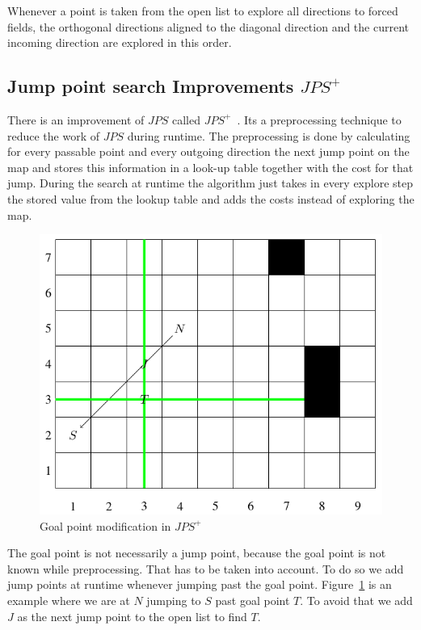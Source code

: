 \documentclass{article}
\begin{document}
    Whenever a point is taken from the open list to explore all directions to forced fields, the orthogonal directions aligned to the diagonal direction and the current incoming direction are explored in this order.
    
    
    \subsection{Jump point search Improvements $JPS^+$}
    
    There is an improvement of $JPS$ called $JPS^+$~\cite{DBLP:conf/aips/HaraborG14}. Its a preprocessing technique to reduce the work of $JPS$ during runtime. The preprocessing is done by calculating for every passable point and every outgoing direction the next jump point on the map and stores this information in a look-up table together with the cost for that jump. During the search at runtime the algorithm just takes in every explore step the stored value from the lookup table and adds the costs instead of exploring the map.
    
        
    \begin{figure}[!htb]
        \centering
        \includegraphics[width=\textwidth]{figures/jpspluspic.png}
        \caption{Goal point modification in $JPS^+$}
        \label{fig:jpsplus}
    \end{figure}
    
    
    The goal point is not necessarily a jump point, because the goal point is not known while preprocessing. That has to be taken into account. To do so we add jump points at runtime whenever jumping past the goal point. Figure~\ref{fig:jpsplus} is an example where we are at $N$ jumping to $S$ past goal point $T$. To avoid that we add $J$ as the next jump point to the open list to find $T$.
\end{document}
